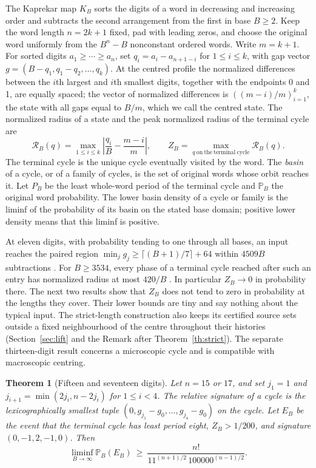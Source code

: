 \documentclass[11pt,reqno]{amsart}
\newtheorem{theorem}{Theorem}
\theoremstyle{remark}
\newcommand{\PP}{\mathbb P}
\begin{document}
The Kaprekar map \(K_B\) sorts the digits of a word in decreasing and
increasing order and subtracts the second arrangement from the first
in base \(B\ge2\). Keep the word length \(n=2k+1\) fixed, pad with leading
zeros, and choose the original word uniformly from the \(B^n-B\)
nonconstant ordered words. Write \(m=k+1\). For sorted digits \(a_1\ge\cdots\ge a_n\),
set \(q_i=a_i-a_{n+1-i}\) for \(1\le i\le k\), with gap vector
\(g=(B-q_1,q_1-q_2,\ldots,q_k)\).
At the centred profile the normalized differences between the \(i\)th
largest and \(i\)th smallest digits, together with the endpoints 0 and 1,
are equally spaced; the vector of normalized differences is
\(((m-i)/m)_{i=1}^k\), the state with all gaps equal to \(B/m\), which we
call the centred state. The normalized radius of a state and the peak
normalized radius of the terminal cycle are
\[
 \mathcal R_B(q)=\max_{1\le i\le k}
        \left|\frac{q_i}{B}-\frac{m-i}{m}\right|,
 \qquad
 Z_B=\max_{q\ \mathrm{on\ the\ terminal\ cycle}}\mathcal R_B(q).
\]
The terminal cycle is the unique cycle eventually visited by the word.
The \emph{basin} of a cycle, or of a family of cycles, is the set of
original words whose orbit reaches it.
Let \(P_B\) be the least whole-word period of the terminal cycle and
\(\PP_B\) the original word probability. The lower basin density of a
cycle or family is the liminf of the probability of its basin on the
stated base domain; positive lower density means that this liminf is
positive.

At eleven digits, with probability tending to one through all bases,
an input reaches the paired region
\(\min_j g_j\ge\lceil(B+1)/7\rceil+64\) within \(4509B\) subtractions
\cite[Theorem~1]{G6}. For \(B\ge3534\), every phase of a terminal cycle
reached after such an entry has normalized radius at most \(420/B\)
\cite[Section~6.2]{G6}.
In particular \(Z_B\to0\) in probability there. The next two results
show that \(Z_B\) does not tend to zero in probability at the lengths
they cover. Their lower bounds are tiny and say nothing about the
typical input. The strict-length construction also keeps its certified
source sets outside a fixed neighbourhood of the centre throughout
their histories (Section~\ref{sec:lift} and the Remark after
Theorem~\ref{th:strict}). The separate thirteen-digit
result concerns a microscopic cycle and is compatible with macroscopic
centring.

\begin{theorem}[Fifteen and seventeen digits]\label{th:eight}
Let \(n=15\) or \(17\), and set \(j_1=1\) and
\(j_{i+1}=\min(2j_i,n-2j_i)\) for \(1\le i<4\). The relative
signature of a cycle is the lexicographically smallest tuple
\((0,g_{j_1}-g_0,\ldots,g_{j_4}-g_0)\) on the cycle.
Let \(E_B\) be the event that the terminal cycle has least period
eight, \(Z_B>1/200\), and signature \((0,-1,2,-1,0)\). Then
\[
 \liminf_{B\to\infty}\PP_B(E_B)
 \ \ge\ \frac{n!}{11^{(n+1)/2}\,100000^{(n-1)/2}}.
\]
\end{theorem}
\end{document}
